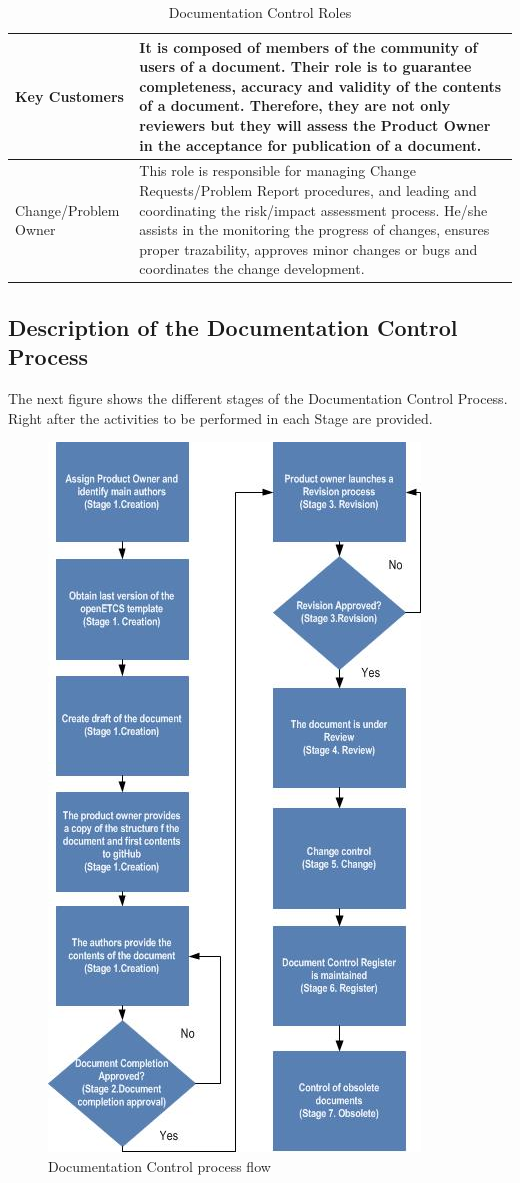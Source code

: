 \documentclass{template/openetcs_article}
\begin{document}
\begin{table}[H]
\begin{tabular}{|m{3cm}|m{11cm}|}
Key Customers &
It is composed of members of the community of users of a document.
Their role is to guarantee completeness, accuracy and validity of the contents of a document. Therefore, they are not only reviewers but they will assess the Product Owner in the acceptance for publication of a document.
\\\hline
Change/Problem Owner & This role is responsible for managing Change Requests/Problem Report procedures, and leading and coordinating the risk/impact assessment process. He/she assists in the monitoring the progress of changes, ensures proper trazability, approves minor changes or bugs and coordinates the change development.
\end{tabular}
\caption{Documentation Control Roles}
\end{table}


\subsection{Description of the Documentation Control Process}

The next figure shows the different stages of the Documentation Control Process. Right after the activities to be performed in each Stage are provided. 

\begin{figure}[H]
\centering
\includegraphics{./figures/DocumentationControlProcess.JPG}
\caption{Documentation Control process flow}
\end{figure}
\end{document}
